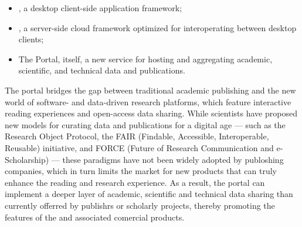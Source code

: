 \documentclass[11pt,letterpaper]{article}
\newenvironment{cframed}{\begin{mdframed}[linecolor=logoPeach,linewidth=0.4mm]}{\end{mdframed}}
\begin{document}
\vspace{.5em}
\begin{cframed}
\begin{itemize}
\item {\VersatileUX}, a desktop client-side application 
framework; 
\item {\NDPCloud}, a server-side cloud framework 
optimized for interoperating between desktop 
clients; 
\item The {\MOSAIC} Portal, itself, a new service for 
hosting and aggregating academic, scientific, and technical 
data and publications.
\end{itemize}
\end{cframed}
\vspace{.5em}
\p{}
The {\MOSAIC} portal bridges the gap between 
traditional academic publishing and the new 
world of software- and data-driven research platforms, 
which feature interactive reading experiences 
and open-access data sharing.  While scientists have 
proposed new models for curating data and publications 
for a digital age --- such as the Research Object Protocol, 
the FAIR (Findable, Accessible, Interoperable, 
Reusable) initiative, and 
FORCE (Future of Research Communication and e-Scholarship) 
--- these paradigms have not been widely adopted by 
publoshing companies, which in turn limits the market 
for new products that can truly enhance the 
reading and research experience.  As a result, 
the {\MOSAIC} portal can implement a deeper layer of 
academic, scientific and technical data sharing 
than currently offerred by publishrs or scholarly 
projects, thereby promoting the features of 
the {\MOSAIC} {\SDK} and associated comercial products.
\end{document}
